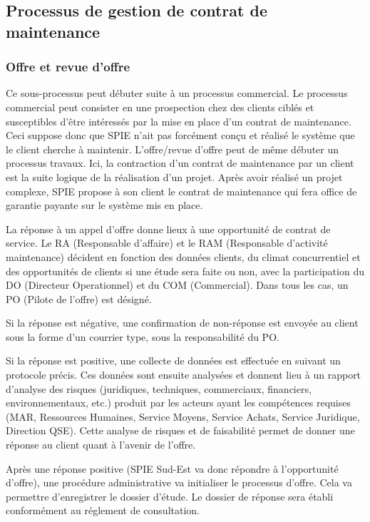 \subsection{Processus de gestion de contrat de maintenance}

\subsubsection{Offre et revue d’offre}

Ce sous-processus peut débuter suite à un processus commercial. Le processus commercial peut consister en une prospection chez des clients ciblés et susceptibles d’être intéressés par la mise en place d’un contrat de maintenance. Ceci suppose donc que SPIE n’ait pas forcément conçu et réalisé le système que le client cherche à maintenir. L’offre/revue d’offre peut de même débuter un processus travaux. Ici, la contraction d’un contrat de maintenance par un client est la suite logique de la réalisation d’un projet. Après avoir réalisé un projet complexe, SPIE propose à son client le contrat de maintenance qui fera office de \og garantie payante \fg sur le système mis en place.

La réponse à un appel d’offre donne lieux à une opportunité de contrat de service. Le RA (Responsable d’affaire) et le RAM (Responsable d’activité maintenance) décident en fonction des données clients, du climat concurrentiel et des opportunités de clients si une étude sera faite ou non, avec la participation du DO (Directeur Operationnel) et du COM (Commercial). Dans tous les cas, un PO (Pilote de l’offre) est désigné.

Si la réponse est négative, une confirmation de non-réponse est envoyée au client sous la forme d’un courrier type, sous la responsabilité du PO.

Si la réponse est positive, une collecte de données est effectuée en suivant un protocole précis. Ces données sont ensuite analysées et donnent lieu à un rapport d’analyse des risques (juridiques, techniques, commerciaux, financiers, environnementaux, etc.) produit par les acteurs ayant les compétences requises (MAR, Ressources Humaines, Service Moyens, Service Achats, Service Juridique, Direction QSE). Cette analyse de risques et de faisabilité permet de donner une réponse au client quant à l'avenir de l’offre.

Après une réponse positive (SPIE Sud-Est va donc répondre à l’opportunité d’offre), une procédure administrative va initialiser le processus d'offre. Cela va permettre d'enregistrer le dossier d'étude. Le dossier de réponse sera établi conformément au réglement de consultation.

